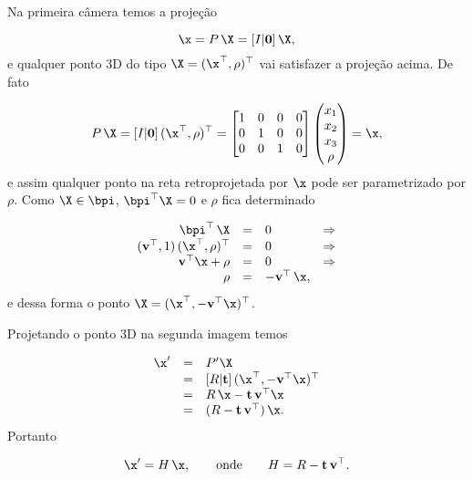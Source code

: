 Na primeira câmera temos a projeção

\begin{equation*}
\x=P\,\X=[I|{\bf 0}]\,\X,
\end{equation*}
e qualquer ponto 3D do tipo $\X=(\x^\top,\rho)^\top$ vai satisfazer a projeção acima. De fato

\begin{equation*}
P\,\X=
[I|{\bf 0}]\,(\x^\top,\rho)^\top=
\begin{bmatrix}
1&0&0&0\\
0&1&0&0\\
0&0&1&0
\end{bmatrix}
\begin{pmatrix}
x_1\\
x_2\\
x_3\\
\rho
\end{pmatrix}
=\x,
\end{equation*}
e assim qualquer ponto na reta retroprojetada por $\x$ pode ser parametrizado por $\rho$. Como $\X\in\bpi$, $\bpi^\top\X=0$ e  
$\rho$ fica determinado

\begin{equation*}
\begin{array}{rcll}
\bpi^\top\,\X&=&0&\Rightarrow\\
({\bf v}^\top,1)\,(\x^\top,\rho)^\top&=&0&\Rightarrow\\
{\bf v}^\top\x+\rho&=&0&\Rightarrow\\
\rho&=&-{\bf v}^\top\,\x,&
\end{array}
\end{equation*}
e dessa forma o ponto $\X=(\x^\top,-{\bf v}^\top\x)^\top$.

Projetando o ponto 3D na segunda imagem temos

\begin{equation*}
\begin{array}{rcl}
\x'&=&P'\X\\
&=&[R|{\bf t}]\,(\x^\top,-{\bf v}^\top\x)^\top\\
&=&R\,\x-{\bf t}\,{\bf v}^\top\x\\
&=&(R-{\bf t}\,{\bf v}^\top)\,\x.
\end{array}
\end{equation*}
Portanto

\begin{equation*}
\x'=H\,\x,\qquad\text{onde}\qquad H=R-{\bf t}\,{\bf v}^\top.
\end{equation*}


